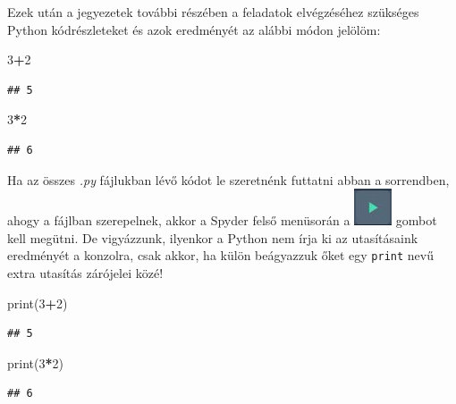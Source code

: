 \documentclass[
]{book}
\newenvironment{Shaded}{\begin{snugshade}}{\end{snugshade}}
\newcommand{\BuiltInTok}[1]{#1}
\newcommand{\DecValTok}[1]{\textcolor[rgb]{0.00,0.00,0.81}{#1}}
\newcommand{\NormalTok}[1]{#1}
\newcommand{\OperatorTok}[1]{\textcolor[rgb]{0.81,0.36,0.00}{\textbf{#1}}}
\begin{document}
Ezek után a jegyezetek további részében a feladatok elvégzéséhez szükséges Python kódrészleteket és azok eredményét az alábbi módon jelölöm:

\begin{Shaded}
\begin{Highlighting}[]
\DecValTok{3}\OperatorTok{+}\DecValTok{2}
\end{Highlighting}
\end{Shaded}

\begin{verbatim}
## 5
\end{verbatim}

\begin{Shaded}
\begin{Highlighting}[]
\DecValTok{3}\OperatorTok{*}\DecValTok{2}
\end{Highlighting}
\end{Shaded}

\begin{verbatim}
## 6
\end{verbatim}

Ha az összes \emph{.py} fájlukban lévő kódot le szeretnénk futtatni abban a sorrendben, ahogy a fájlban szerepelnek, akkor a Spyder felső menüsorán a \includegraphics{RunFile.jpg} gombot kell megütni. De vigyázzunk, ilyenkor a Python nem írja ki az utasításaink eredményét a konzolra, csak akkor, ha külön beágyazzuk őket egy \texttt{print} nevű extra utasítás zárójelei közé!

\begin{Shaded}
\begin{Highlighting}[]
\BuiltInTok{print}\NormalTok{(}\DecValTok{3}\OperatorTok{+}\DecValTok{2}\NormalTok{)}
\end{Highlighting}
\end{Shaded}

\begin{verbatim}
## 5
\end{verbatim}

\begin{Shaded}
\begin{Highlighting}[]
\BuiltInTok{print}\NormalTok{(}\DecValTok{3}\OperatorTok{*}\DecValTok{2}\NormalTok{)}
\end{Highlighting}
\end{Shaded}

\begin{verbatim}
## 6
\end{verbatim}
\end{document}
